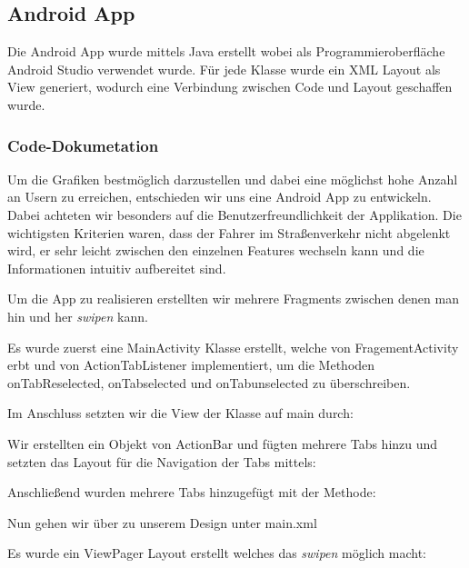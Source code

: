 \subsection{Android App}

Die Android App wurde mittels Java erstellt wobei als Programmieroberfläche Android Studio verwendet wurde.
Für jede Klasse wurde ein XML Layout als View generiert, wodurch eine Verbindung zwischen Code und Layout geschaffen wurde.

\subsubsection{Code-Dokumetation}

 Um die Grafiken bestmöglich darzustellen und dabei eine möglichst hohe Anzahl an Usern zu erreichen, entschieden wir uns eine Android App zu entwickeln.
 Dabei achteten wir besonders auf die Benutzerfreundlichkeit der Applikation.
 Die wichtigsten Kriterien waren, dass der Fahrer im Straßenverkehr nicht abgelenkt wird, er sehr leicht zwischen den einzelnen Features wechseln kann und die Informationen intuitiv aufbereitet sind.
 
 Um die App zu realisieren erstellten wir mehrere Fragments zwischen denen man hin und her \textit{swipen} kann.
 

 Es wurde zuerst eine MainActivity Klasse erstellt, welche von FragementActivity erbt und von ActionTabListener implementiert, um die Methoden onTabReselected, onTabselected und onTabunselected zu überschreiben.   
 
            
Im Anschluss setzten wir die View der Klasse auf main durch:  



Wir erstellten ein Objekt von ActionBar und fügten mehrere Tabs hinzu und setzten das Layout für die Navigation der Tabs mittels:



Anschließend wurden mehrere Tabs hinzugefügt mit der Methode:




Nun gehen wir über zu unserem Design unter main.xml

Es wurde ein ViewPager Layout erstellt welches das \textit{swipen} möglich macht:


